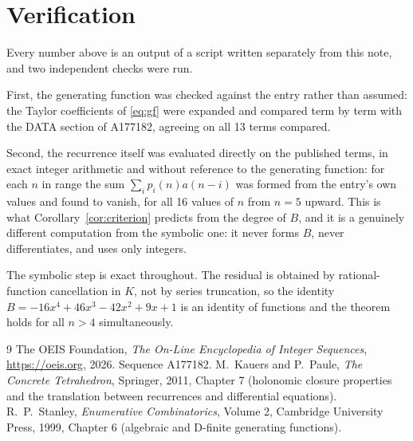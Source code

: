 \documentclass[11pt,a4paper]{article}
\theoremstyle{plain}
\theoremstyle{definition}
\begin{document}
\section{Verification}

Every number above is an output of a script written separately from this note, and two
independent checks were run.

First, the generating function was checked against the entry rather than assumed: the
Taylor coefficients of \eqref{eq:gf} were expanded and compared term by term with the DATA
section of A177182, agreeing on all 13 terms compared.

Second, the recurrence itself was evaluated directly on the published terms, in exact
integer arithmetic and without reference to the generating function: for each $n$ in range
the sum $\sum_{i}p_{i}(n)a(n-i)$ was formed from the entry's own values and found to
vanish, for all 16 values of $n$ from $n=5$ upward. This is what
Corollary~\ref{cor:criterion} predicts from the degree of $B$, and it is a genuinely
different computation from the symbolic one: it never forms $B$, never differentiates, and
uses only integers.

The symbolic step is exact throughout. The residual is obtained by rational-function
cancellation in $K$, not by series truncation, so the identity $B=- 16 x^{4} + 46 x^{3} - 42 x^{2} + 9 x + 1$ is an
identity of functions and the theorem holds for all $n>4$ simultaneously.

\begin{thebibliography}{9}
 The OEIS Foundation, \emph{The On-Line Encyclopedia of Integer Sequences},
\url{https://oeis.org}, 2026. Sequence A177182.
 M.~Kauers and P.~Paule, \emph{The Concrete Tetrahedron}, Springer, 2011,
Chapter 7 (holonomic closure properties and the translation between recurrences and
differential equations).
 R.~P.~Stanley, \emph{Enumerative Combinatorics}, Volume 2, Cambridge
University Press, 1999, Chapter 6 (algebraic and D-finite generating functions).
\end{thebibliography}
\end{document}

